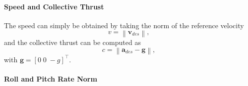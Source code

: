 \documentclass[10pt,a4paper,fleqn]{article}
\newcommand{\bVec}[1]{\mathbf{#1}}
\newcommand{\norm}[1]{\left\lVert#1\right\rVert}
\begin{document}
\paragraph{Speed and Collective Thrust\newline\newline}
The speed can simply be obtained by taking the norm of the reference velocity
%
\begin{equation}
	v = \norm{\bVec{v}_{des}},
\end{equation}
%
and the collective thrust can be computed as
%
\begin{equation}
	c = \norm{\bVec{a}_{des} - \bVec{g}},
\end{equation}
%
with $\bVec{g} = [0 \; 0 \; -g]^{\top}$.

\paragraph{Roll and Pitch Rate Norm\newline\newline}
\end{document}

